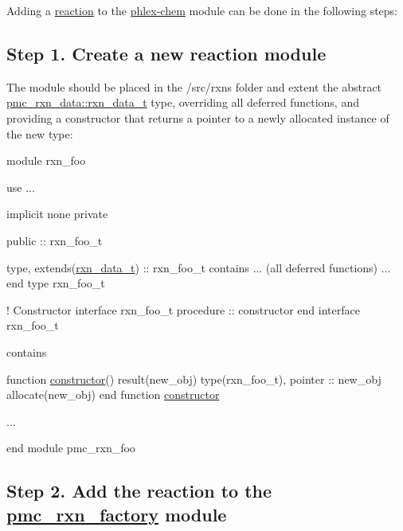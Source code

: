Adding a \mbox{\hyperlink{phlex_rxn}{reaction}} to the \mbox{\hyperlink{phlex_chem}{phlex-\/chem}} module can be done in the following steps\+:

\subsection*{Step 1. Create a new reaction module}

The module should be placed in the {\ttfamily /src/rxns} folder and extent the abstract {\ttfamily \mbox{\hyperlink{structpmc__rxn__data_1_1rxn__data__t}{pmc\+\_\+rxn\+\_\+data\+::rxn\+\_\+data\+\_\+t}}} type, overriding all deferred functions, and providing a constructor that returns a pointer to a newly allocated instance of the new type\+:


\begin{DoxyCode}
\textcolor{keyword}{module} rxn\_foo

  \textcolor{keywordtype}{use }...

  \textcolor{keywordtype}{implicit none}
  \textcolor{keywordtype}{private}

  \textcolor{keywordtype}{public} :: rxn\_foo\_t

  \textcolor{keyword}{type}, \textcolor{keyword}{extends}(\mbox{\hyperlink{structpmc__rxn__data_1_1rxn__data__t}{rxn\_data\_t}}) :: rxn\_foo\_t
  \textcolor{keyword}{contains}
     ... (all \textcolor{keywordtype}{deferred} functions) ...
\textcolor{keyword}{  end type }rxn\_foo\_t

  \textcolor{comment}{! Constructor}
  \textcolor{keyword}{interface} rxn\_foo\_t
    \textcolor{keywordtype}{procedure} :: constructor
\textcolor{keyword}{  end interface }rxn\_foo\_t

\textcolor{keyword}{contains}

\textcolor{keyword}{  function }\mbox{\hyperlink{namespacepmc__aero__phase__data_ae2a9e6bfb1747e2ace93ab3fadd55530}{constructor}}() \textcolor{keyword}{result}(new\_obj)
    \textcolor{keywordtype}{type}(rxn\_foo\_t), \textcolor{keywordtype}{pointer} :: new\_obj
    \textcolor{keyword}{allocate}(new\_obj)
\textcolor{keyword}{  end function }\mbox{\hyperlink{namespacepmc__aero__phase__data_ae2a9e6bfb1747e2ace93ab3fadd55530}{constructor}}

  ...

\textcolor{keyword}{end module }pmc\_rxn\_foo
\end{DoxyCode}


\subsection*{Step 2. Add the reaction to the {\ttfamily \mbox{\hyperlink{namespacepmc__rxn__factory}{pmc\+\_\+rxn\+\_\+factory}}} module}


